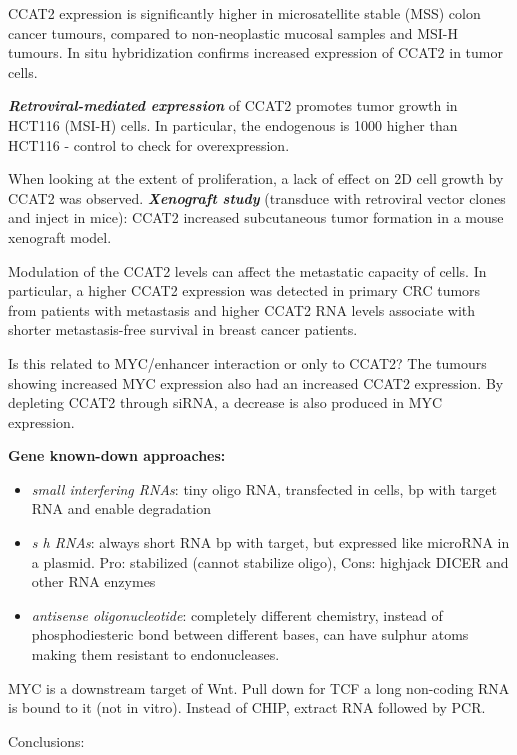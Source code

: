 CCAT2 expression is significantly higher in microsatellite stable (MSS) colon cancer tumours, compared to non-neoplastic mucosal samples and MSI-H tumours. In situ hybridization confirms increased expression of CCAT2 in tumor cells.

\textbf{\emph{Retroviral-mediated expression}} of CCAT2 promotes tumor growth in HCT116 (MSI-H) cells. In particular, the endogenous is 1000 higher than HCT116 - control to check for overexpression.

When looking at the extent of proliferation, a lack of effect on 2D cell growth by CCAT2 was observed. \textbf{\emph{Xenograft study}} (transduce with retroviral vector clones and inject in mice): CCAT2 increased subcutaneous tumor formation in a mouse xenograft model.

Modulation of the CCAT2 levels can affect the metastatic capacity of cells. In particular, a higher CCAT2 expression was detected in primary CRC tumors from patients with metastasis and higher CCAT2 RNA levels associate with shorter metastasis-free survival in breast cancer patients.

Is this related to MYC/enhancer interaction or only to CCAT2? The tumours showing increased MYC expression also had an increased CCAT2 expression. By depleting CCAT2 through siRNA, a decrease is also produced in MYC expression.

\textbf{Gene known-down approaches:}

\begin{itemize}
\tightlist
\item
  \emph{small interfering RNAs}: tiny oligo RNA, transfected in cells, bp with target RNA and enable degradation
\item
  \emph{s h RNAs}: always short RNA bp with target, but expressed like microRNA in a plasmid. Pro: stabilized (cannot stabilize oligo), Cons: highjack DICER and other RNA enzymes
\item
  \emph{antisense oligonucleotide}: completely different chemistry, instead of phosphodiesteric bond between different bases, can have sulphur atoms making them resistant to endonucleases.
\end{itemize}

MYC is a downstream target of Wnt. Pull down for TCF a long non-coding RNA is bound to it (not in vitro). Instead of CHIP, extract RNA followed by PCR.

Conclusions:

